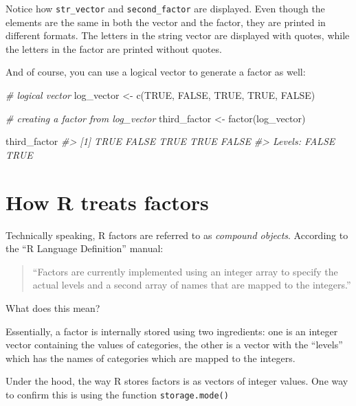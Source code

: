 \documentclass[
]{book}
\newenvironment{Shaded}{\begin{snugshade}}{\end{snugshade}}
\newcommand{\CommentTok}[1]{\textcolor[rgb]{0.56,0.35,0.01}{\textit{#1}}}
\newcommand{\ConstantTok}[1]{\textcolor[rgb]{0.00,0.00,0.00}{#1}}
\newcommand{\FunctionTok}[1]{\textcolor[rgb]{0.00,0.00,0.00}{#1}}
\newcommand{\NormalTok}[1]{#1}
\newcommand{\OtherTok}[1]{\textcolor[rgb]{0.56,0.35,0.01}{#1}}
\begin{document}
Notice how \texttt{str\_vector} and \texttt{second\_factor} are displayed. Even though the
elements are the same in both the vector and the factor, they are printed in
different formats. The letters in the string vector are displayed with quotes,
while the letters in the factor are printed without quotes.

And of course, you can use a logical vector to generate a factor as well:

\begin{Shaded}
\begin{Highlighting}[]
\CommentTok{\# logical vector}
\NormalTok{log\_vector }\OtherTok{\textless{}{-}} \FunctionTok{c}\NormalTok{(}\ConstantTok{TRUE}\NormalTok{, }\ConstantTok{FALSE}\NormalTok{, }\ConstantTok{TRUE}\NormalTok{, }\ConstantTok{TRUE}\NormalTok{, }\ConstantTok{FALSE}\NormalTok{)}

\CommentTok{\# creating a factor from log\_vector}
\NormalTok{third\_factor }\OtherTok{\textless{}{-}} \FunctionTok{factor}\NormalTok{(log\_vector)}

\NormalTok{third\_factor}
\CommentTok{\#\textgreater{} [1] TRUE  FALSE TRUE  TRUE  FALSE}
\CommentTok{\#\textgreater{} Levels: FALSE TRUE}
\end{Highlighting}
\end{Shaded}

\hypertarget{how-r-treats-factors}{%
\section{How R treats factors}\label{how-r-treats-factors}}

Technically speaking, R factors are referred to as \emph{compound objects}. According
to the ``R Language Definition'' manual:

\begin{quote}
``Factors are currently implemented using an integer array to specify the
actual levels and a second array of names that are mapped to the integers.''
\end{quote}

What does this mean?

Essentially, a factor is internally stored using two ingredients: one is an
integer vector containing the values of categories, the other is a vector with
the ``levels'' which has the names of categories which are mapped to the integers.

Under the hood, the way R stores factors is as vectors of integer values.
One way to confirm this is using the function \texttt{storage.mode()}
\end{document}
